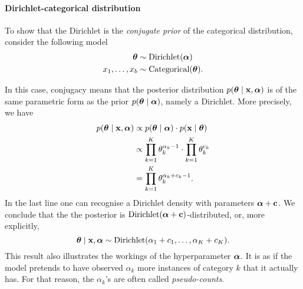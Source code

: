 \documentclass{../src/bcthesispart}
\begin{document}
\paragraph{Dirichlet-categorical distribution}

To show that the Dirichlet is the \emph{conjugate prior} of the categorical distribution, consider the following model
\begin{align}
	\boldsymbol{\mathbf{\theta}} 
		&\sim \text{Dirichlet}(\boldsymbol{\mathbf{\alpha}})
	\\
	x_1, \dots, x_b 
		&\sim \text{Categorical}(\boldsymbol{\mathbf{\theta}}).
\end{align}

In this case, conjugacy means that the posterior distribution $p(\boldsymbol{\mathbf{\theta}} \mid \boldsymbol{\mathbf{x}}, \boldsymbol{\mathbf{\alpha}})$ is of the same parametric form as the prior $p(\boldsymbol{\mathbf{\theta}} \mid \boldsymbol{\mathbf{\alpha}})$, namely a Dirichlet.
More precisely, we have
\begin{align}
	p(\boldsymbol{\mathbf{\theta}} \mid \boldsymbol{\mathbf{x}}, \boldsymbol{\mathbf{\alpha}}) 
		&\propto p(\boldsymbol{\mathbf{\theta}}\mid \boldsymbol{\mathbf{\alpha}}) \cdot p(\boldsymbol{\mathbf{x}} \mid \boldsymbol{\mathbf{\theta}}) 
		\\
		&\propto 
			\prod_{k=1}^K \theta_k^{\alpha_k - 1}
			\cdot \prod_{k=1}^K \theta_k^{c_k} 
		\\
		&= \prod_{k=1}^K \theta_k^{\alpha_k + c_k - 1}. 
			\label{eq:app-bng:joint-density-dirichlet}
\end{align}
In the last line one can recognise a Dirichlet density with parameters $\boldsymbol{\mathbf{\alpha}} + \boldsymbol{\mathbf{c}}$.
We conclude that the the posterior is $\text{Dirichlet}(\boldsymbol{\mathbf{\alpha}} +\boldsymbol{\mathbf{c}})$-distributed, or, more explicitly,
\begin{equation}
	\boldsymbol{\mathbf{\theta}} \mid \boldsymbol{\mathbf{x}}, \boldsymbol{\mathbf{\alpha}} \sim \text{Dirichlet}(\alpha_1 + c_1, \dots, \alpha_K+c_K).
\end{equation}
This result also illustrates the workings of the hyperparameter $\boldsymbol{\mathbf{\alpha}}$.
It is as if the model pretends to have observed $\alpha_k$ more instances of category $k$ that it actually has.
For that reason, the $\alpha_k$'s are often called \emph{pseudo-counts}.
\end{document}
